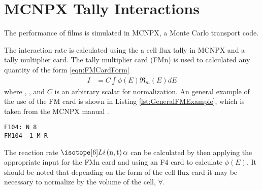 \chapter{MCNPX Tally Interactions}
The performance of films is simulated in MCNPX, a Monte Carlo transport code\cite{pelowitz_mcnpx_????}.

The interaction rate is calculated using the a cell flux tally in MCNPX and a tally multiplier card.
The tally multiplier card (FMn) is used to calculated any quantity of the form \eqref{eqn:FMCardForm} \cite{pelowitz_mcnpx_2006}
\begin{align}
  \label{eqn:FMCardForm}
  I &= C\int\phi(E)\Re_m(E)dE
\end{align}
where ,  ,  and $C$ is an arbitrary scalar for normalization.
An general example of the use of the FM card is shown in Listing \ref{lst:GeneralFMExample}, which is taken from the MCNPX manual \cite{pelowitz_mcnpx_????}.
\begin{lstlisting}[caption={[Example usage of the FM card]Example usage of the FM card to calculate the number of reactions per \si{\cm\cubed} of type R in cell 8 of material M. The normalization is by atomic density, signified by the -1},label={lst:GeneralFMExample}]
F104: N 8
FM104 -1 M R
\end{lstlisting}

The reaction rate $\iso[6]{Li}\left(\text{n},\text{t}\right)\alpha$ can be calculated by then applying the appropriate input for the FMn card and using an F4 card to calculate $\phi(E)$.
It should be noted that depending on the form of the cell flux card it may be necessary to normalize by the volume of the cell, $\forall$.

